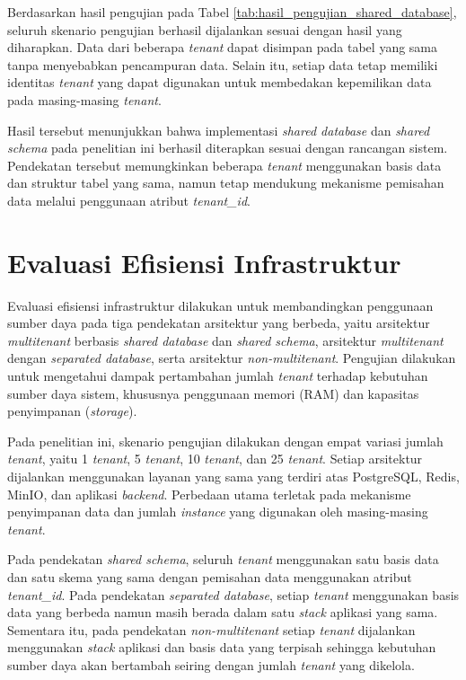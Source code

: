 Berdasarkan hasil pengujian pada Tabel \ref{tab:hasil_pengujian_shared_database}, seluruh skenario pengujian berhasil dijalankan sesuai dengan hasil yang diharapkan. Data dari beberapa \textit{tenant} dapat disimpan pada tabel yang sama tanpa menyebabkan pencampuran data. Selain itu, setiap data tetap memiliki identitas \textit{tenant} yang dapat digunakan untuk membedakan kepemilikan data pada masing-masing \textit{tenant}.

Hasil tersebut menunjukkan bahwa implementasi \textit{shared database} dan \textit{shared schema} pada penelitian ini berhasil diterapkan sesuai dengan rancangan sistem. Pendekatan tersebut memungkinkan beberapa \textit{tenant} menggunakan basis data dan struktur tabel yang sama, namun tetap mendukung mekanisme pemisahan data melalui penggunaan atribut \textit{tenant\_id}.

\section{Evaluasi Efisiensi Infrastruktur}

Evaluasi efisiensi infrastruktur dilakukan untuk membandingkan penggunaan sumber daya pada tiga pendekatan arsitektur yang berbeda, yaitu arsitektur \textit{multitenant} berbasis \textit{shared database} dan \textit{shared schema}, arsitektur \textit{multitenant} dengan \textit{separated database}, serta arsitektur \textit{non-multitenant}. Pengujian dilakukan untuk mengetahui dampak pertambahan jumlah \textit{tenant} terhadap kebutuhan sumber daya sistem, khususnya penggunaan memori (RAM) dan kapasitas penyimpanan (\textit{storage}).

Pada penelitian ini, skenario pengujian dilakukan dengan empat variasi jumlah \textit{tenant}, yaitu 1 \textit{tenant}, 5 \textit{tenant}, 10 \textit{tenant}, dan 25 \textit{tenant}. Setiap arsitektur dijalankan menggunakan layanan yang sama yang terdiri atas PostgreSQL, Redis, MinIO, dan aplikasi \textit{backend}. Perbedaan utama terletak pada mekanisme penyimpanan data dan jumlah \textit{instance} yang digunakan oleh masing-masing \textit{tenant}.

Pada pendekatan \textit{shared schema}, seluruh \textit{tenant} menggunakan satu basis data dan satu skema yang sama dengan pemisahan data menggunakan atribut \textit{tenant\_id}. Pada pendekatan \textit{separated database}, setiap \textit{tenant} menggunakan basis data yang berbeda namun masih berada dalam satu \textit{stack} aplikasi yang sama. Sementara itu, pada pendekatan \textit{non-multitenant} setiap \textit{tenant} dijalankan menggunakan \textit{stack} aplikasi dan basis data yang terpisah sehingga kebutuhan sumber daya akan bertambah seiring dengan jumlah \textit{tenant} yang dikelola.

